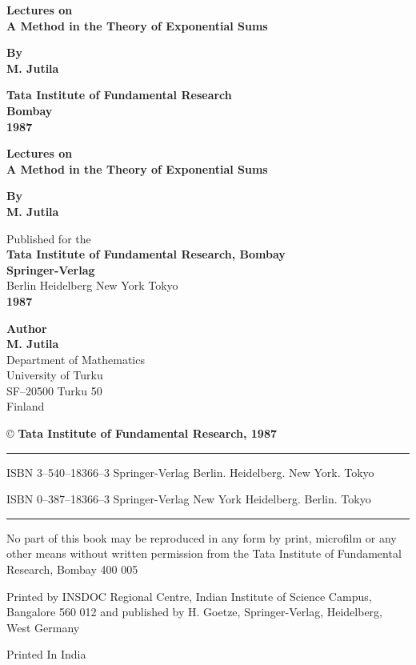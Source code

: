 \thispagestyle{empty}
\begin{center}
{\Large\bf Lectures on}\\[5pt]
{\Large\bf A Method in the Theory of Exponential Sums}
\vfill

{\bf By}\\[5pt]
{\large\bf M. Jutila}
\vfill


{\bf Tata Institute of Fundamental Research}\\
{\bf Bombay}\\
{\bf 1987}
\end{center}

\eject

\thispagestyle{empty}
\begin{center}
{\Large\bf Lectures on}\\[5pt]
{\Large\bf A Method in the Theory of Exponential Sums}
\vfill

{\bf By}\\[5pt]
{\large\bf M. Jutila}
\vfill

{Published for the}\\[5pt]
{\bf Tata Institute of Fundamental Research, Bombay}\\
{\bf Springer-Verlag}\\
{Berlin Heidelberg New York Tokyo}\\
{\bf 1987}
\end{center}

\eject


\thispagestyle{empty}
\begin{center}
{\bf Author}\\[6pt]
{\large\bf M. Jutila}\\
{Department of Mathematics}\\
University of Turku\\
SF--20500 Turku 50\\
Finland
\vfill

\copyright \; {\bf Tata Institute of Fundamental Research, 1987}
\vskip 2cm

\noindent\rule{\textwidth}{1pt}
{\small

ISBN  3--540--18366--3  Springer-Verlag  Berlin.  Heidelberg. New York. Tokyo

ISBN  0--387--18366--3  Springer-Verlag  New York  Heidelberg. Berlin. Tokyo}

\noindent\rule{\textwidth}{1pt}
\vfill


\parbox{0.7\textwidth}{No part of this book may be reproduced in any form
by print, microfilm or any other means without 
written permission from the Tata Institute of 
Fundamental Research, Bombay 400 005}
\vfill

\parbox{0.7\textwidth}{Printed by INSDOC Regional Centre, Indian 
Institute of Science Campus, Bangalore 560 012
and published by H. Goetze, Springer-Verlag,
Heidelberg, West Germany}
\vfill

Printed In India
\end{center}

